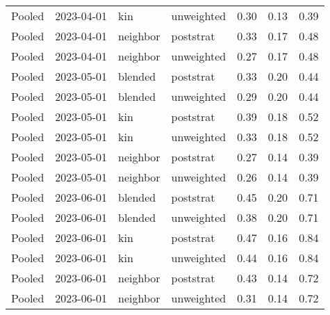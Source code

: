 \begin{table}[ht]
\begin{tabular}{llllrrr}
  Pooled & 2023-04-01 & kin & unweighted & 0.30 & 0.13 & 0.39 \\ 
  Pooled & 2023-04-01 & neighbor & poststrat & 0.33 & 0.17 & 0.48 \\ 
  Pooled & 2023-04-01 & neighbor & unweighted & 0.27 & 0.17 & 0.48 \\ 
  Pooled & 2023-05-01 & blended & poststrat & 0.33 & 0.20 & 0.44 \\ 
  Pooled & 2023-05-01 & blended & unweighted & 0.29 & 0.20 & 0.44 \\ 
  Pooled & 2023-05-01 & kin & poststrat & 0.39 & 0.18 & 0.52 \\ 
  Pooled & 2023-05-01 & kin & unweighted & 0.33 & 0.18 & 0.52 \\ 
  Pooled & 2023-05-01 & neighbor & poststrat & 0.27 & 0.14 & 0.39 \\ 
  Pooled & 2023-05-01 & neighbor & unweighted & 0.26 & 0.14 & 0.39 \\ 
  Pooled & 2023-06-01 & blended & poststrat & 0.45 & 0.20 & 0.71 \\ 
  Pooled & 2023-06-01 & blended & unweighted & 0.38 & 0.20 & 0.71 \\ 
  Pooled & 2023-06-01 & kin & poststrat & 0.47 & 0.16 & 0.84 \\ 
  Pooled & 2023-06-01 & kin & unweighted & 0.44 & 0.16 & 0.84 \\ 
  Pooled & 2023-06-01 & neighbor & poststrat & 0.43 & 0.14 & 0.72 \\ 
  Pooled & 2023-06-01 & neighbor & unweighted & 0.31 & 0.14 & 0.72 \\ 
  \end{tabular}
\caption{} 
\label{table:preregister_monthly}
\end{table}
